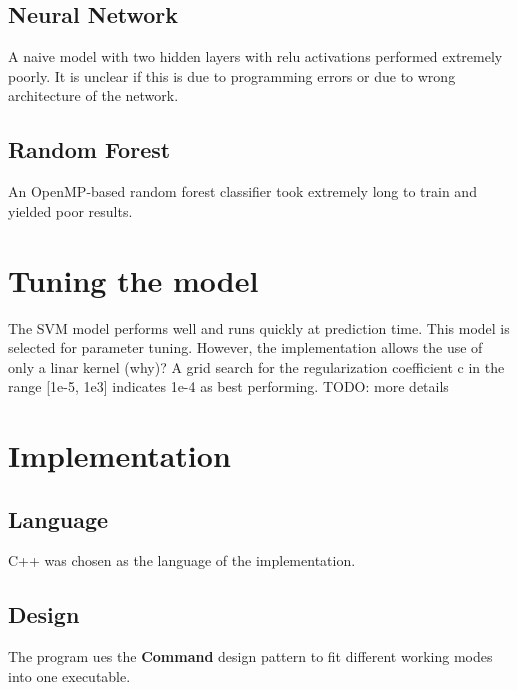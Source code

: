 \documentclass{article}
\begin{document}


\subsection{Neural Network}
A naive model with two hidden layers with relu activations performed extremely poorly.
It is unclear if this is due to programming errors or due to wrong architecture of the network.


\subsection{Random Forest}
An OpenMP-based random forest classifier took extremely long to train and yielded poor results.


\section{Tuning the model}
The SVM model performs well and runs quickly at prediction time.
This model is selected for parameter tuning.
However, the implementation allows the use of only a linar kernel (why)?
A grid search for the regularization coefficient c in the range [1e-5, 1e3] indicates 1e-4 as best performing.
TODO: more details


\section{Implementation}
\subsection{Language}
C++ was chosen as the language of the implementation.


\subsection{Design}
The program ues the \textbf{Command} design pattern to fit different working modes into one executable.
\end{document}
